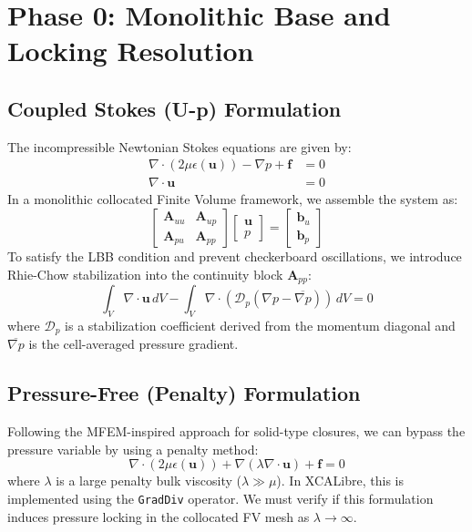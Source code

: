 \section{Phase 0: Monolithic Base and Locking Resolution}

\subsection{Coupled Stokes (U-p) Formulation}
The incompressible Newtonian Stokes equations are given by:
\begin{align}
    \nabla \cdot (2\mu \epsilon(\mathbf{u})) - \nabla p + \mathbf{f} &= 0 \\
    \nabla \cdot \mathbf{u} &= 0
\end{align}
In a monolithic collocated Finite Volume framework, we assemble the system as:
\begin{equation}
    \begin{bmatrix}
        \mathbf{A}_{uu} & \mathbf{A}_{up} \\
        \mathbf{A}_{pu} & \mathbf{A}_{pp}
    \end{bmatrix}
    \begin{bmatrix}
        \mathbf{u} \\
        p
    \end{bmatrix}
    =
    \begin{bmatrix}
        \mathbf{b}_u \\
        \mathbf{b}_p
    \end{bmatrix}
\end{equation}
To satisfy the LBB condition and prevent checkerboard oscillations, we introduce Rhie-Chow stabilization into the continuity block $\mathbf{A}_{pp}$:
\begin{equation}
    \int_V \nabla \cdot \mathbf{u} \, dV - \int_V \nabla \cdot (\mathcal{D}_p (\nabla p - \overline{\nabla p})) \, dV = 0
\end{equation}
where $\mathcal{D}_p$ is a stabilization coefficient derived from the momentum diagonal and $\overline{\nabla p}$ is the cell-averaged pressure gradient.

\subsection{Pressure-Free (Penalty) Formulation}
Following the MFEM-inspired approach for solid-type closures, we can bypass the pressure variable by using a penalty method:
\begin{equation}
    \nabla \cdot (2\mu \epsilon(\mathbf{u})) + \nabla (\lambda \nabla \cdot \mathbf{u}) + \mathbf{f} = 0
\end{equation}
where $\lambda$ is a large penalty bulk viscosity ($\lambda \gg \mu$). In XCALibre, this is implemented using the \texttt{GradDiv} operator. We must verify if this formulation induces pressure locking in the collocated FV mesh as $\lambda \to \infty$.

